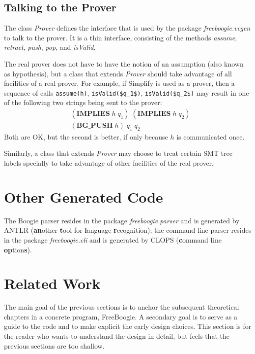 \documentclass[a4paper]{article}
\newcommand{\jmlCode}{\lstinline[style=jml,basicstyle=\normalsize]}
\def\fb#1{{\bf #1}} %
\theoremstyle{slanted}
\theoremstyle{definition}
\theoremstyle{remark}
\begin{document}
\subsection{Talking to the Prover}

The class \textit{Prover} defines the interface that is used
by the package \textit{freeboogie.vcgen} to talk to the
prover. It is a thin interface, consisting of the methods
\textit{assume}, \textit{retract}, \textit{push}, \textit{pop},
and \textit{isValid}.

The real prover does not have to have the notion of an
assumption (also known as hypothesis), but a class that extends
\textit{Prover} should take advantage of all facilities of a real
prover. For example, if Simplify is used as a prover, then a
sequence of calls \jmlCode|assume(h)|, \jmlCode|isValid($q_1$)|,
\jmlCode|isValid($q_2$)| may result in one of the following two
strings being sent to the prover:
\begin{align}
&(\mathbf{IMPLIES}\;h\;q_1)\;(\mathbf{IMPLIES}\;h\;q_2)\\
&(\mathbf{BG\_PUSH}\;h)\;q_1\;q_2
\end{align}
Both are OK, but the second is better, if only because
$h$ is communicated once.

Similarly, a class that extends \textit{Prover} may choose to
treat certain SMT tree labels specially to take advantage of
other facilities of the real prover.

\section{Other Generated Code}

The Boogie parser resides in the package
\textit{freeboogie.parser} and is generated by ANTLR
(\textbf{an}other \fb tool for \fb language \fb
recognition); the command line parser resides in the package
\textit{freeboogie.cli} and is generated by CLOPS (\fb command
\fb line \textbf{op}tion\textbf{s}).

\section{Related Work}

The main goal of the previous sections is to anchor the
subsequent theoretical chapters in a concrete program,
FreeBoogie. A secondary goal is to serve as a guide to the code
and to make explicit the early design choices. This section is
for the reader who wants to understand the design in detail, but
feels that the previous sections are too shallow.
\end{document}
